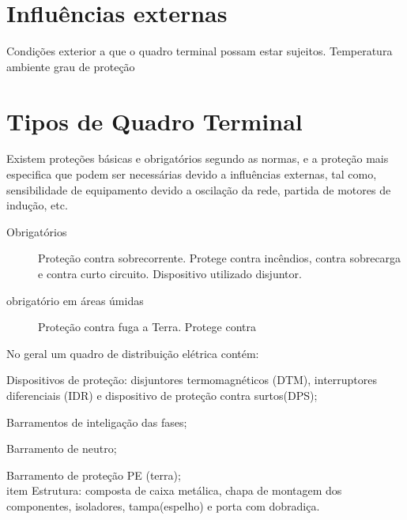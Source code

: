 \section{Influências externas}

Condições exterior a que o quadro terminal possam estar sujeitos.
Temperatura ambiente
grau de proteção

\section{Tipos de Quadro Terminal}

Existem proteções básicas e obrigatórios segundo as normas, e a proteção mais especifica que podem ser necessárias devido a influências externas, tal como, sensibilidade de equipamento devido a oscilação da rede, partida de motores de indução, etc.
\begin{description}
\item[Obrigatórios] Proteção contra sobrecorrente. Protege contra incêndios, contra sobrecarga e contra curto circuito. Dispositivo utilizado disjuntor.
\item[obrigatório em áreas úmidas] Proteção contra fuga a Terra. Protege contra
\end{description}

No geral um quadro de distribuição elétrica contém:
\begin{list}{•}{•}
\item Dispositivos de proteção: disjuntores termomagnéticos (DTM), interruptores diferenciais (IDR) e dispositivo de proteção contra surtos(DPS);
\item Barramentos de inteligação das fases;
\item Barramento de neutro;
\item Barramento de proteção PE (terra);
\\item Estrutura: composta de caixa metálica, chapa de montagem dos componentes, isoladores, tampa(espelho) e porta com dobradiça.
\end{list}

